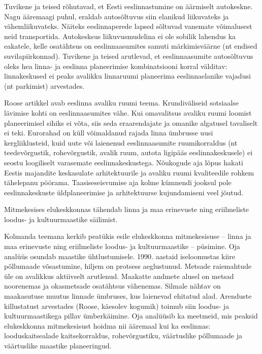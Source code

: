 \documentclass[estonian,]{article}
\begin{document}
Tuvikene ja teised rõhutavad, et Eesti eeslinnastumine on äärmiselt autokeskne. Nagu ääremaagi puhul, eraldab autosõltuvus siin elanikud liikuvateks ja vähemliikuvateks. Näiteks eeslinnaperede lapsed sõltuvad vanemate võimalusest neid transportida. Autokesksus liikuvusmudelina ei ole sobilik lahendus ka eakatele, kelle osatähtsus on eeslinnaasumites samuti märkimisväärne (nt endised suvilapiirkonnad). Tuvikene ja teised arutlevad, et eeslinnaasumite autosõltuvus oleks hea linna- ja eeslinna planeerimise kombinatsiooni korral välditav: linnakeskused ei peaks avalikku linnaruumi planeerima eeslinnaelanike vajadusi (nt parkimist) arvestades.

Roose artikkel avab eeslinna avaliku ruumi teema. Krundiväliseid sotsiaalse lävimise kohti on eeslinnaasumites vähe. Kui omavalitsus avaliku ruumi loomist planeerimisel sihiks ei võta, siis seda eraarendajate ja omanike algatusel tavaliselt ei teki. Eurorahad on küll võimaldanud rajada linna ümbrusse uusi kergliiklusteid, kuid uute või laienenud eeslinnaasumite ruumikorraldus (nt teedevõrgustik, rohevõrgustik, avalik ruum, autota ligipääs eeslinnakeskusele) ei seostu loogiliselt varasemate eeslinnakeskustega. Nõukogude aja lõpus hakati Eestis majandite keskasulate arhitektuurile ja avaliku ruumi kvaliteedile rohkem tähelepanu pöörama. Taasiseseisvumise aja kolme kümnendi jooksul pole eeslinnakeskuste üldplaneerimise ja arhitektuurse kujundamiseni veel jõutud.

\begin{blockquote-left}
Mitmekesises elukeskkonnas tähendab linna ja maa erinevuste ning
eriilmeliste loodus- ja kultuurmaastike säilimist.
\end{blockquote-left}

Kolmanda teemana kerkib peatükis esile elukeskkonna mitmekesisuse -- linna ja maa erinevuste ning eriilmeliste loodus- ja kultuurmaastike -- püsimine. Oja analüüs osundab maastike ühtlustumisele. 1990. aastaid iseloomustas kiire põllumaade võsastumine, hiljem on protsess aeglustunud. Metsade raiemahtude üle on avalikkus aktiivselt arutlenud. Maakatte andmete alusel on metsad noorenemas ja okasmetsade osatähtsus vähenemas. Silmale nähtav on maakasutuse muutus linnade ümbruses, kus laienevad ehitatud alad. Arenduste killustatust arvestades (Roose, käesolev kogumik) toimub siin loodus- ja kultuurmaastikega pillav ümberkäimine. Oja analüüsib ka meetmeid, mis peaksid elukeskkonna mitmekesisust hoidma nii ääremaal kui ka eeslinnas: looduskaitsealade kaitsekorraldus, rohevõrgustiku, väärtuslike põllumaade ja väärtuslike maastike planeeringud.
\end{document}
